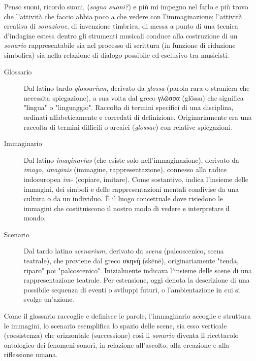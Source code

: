 Penso suoni, ricordo suoni, (\emph{sogno suoni?}) e più mi impegno nel farlo e
più trovo che l'attività che faccio abbia poco a che vedere con l'immaginazione;
l'attività creativa di \emph{sonazione}, di invenzione timbrica, di messa a
punto di una tecnica d'indagine estesa dentro gli strumenti musicali
\cite{netti23} conduce alla costruzione di un \emph{sonario} rappresentabile sia
nel processo di scrittura (in funzione di riduzione simbolica) sia nella
relazione di dialogo possibile ed esclusivo tra musicisti.

\begin{description}
  \item[Glossario] Dal latino tardo \emph{glossarium}, derivato da \emph{glossa}
  (parola rara o straniera che necessita spiegazione), a sua volta dal greco
  \textgreek{γλῶσσα} (glōssa) che significa "lingua" o "linguaggio". Raccolta di
  termini specifici di una disciplina, ordinati alfabeticamente e corredati di
  definizione. Originariamente era una raccolta di termini difficili o arcaici
  (\emph{glossae}) con relative spiegazioni.
  \item[Immaginario] Dal latino \emph{imaginarius} (che esiste solo
  nell'immaginazione), derivato da \emph{imago, imaginis} (immagine,
  rappresentazione), connesso alla radice indoeuropea \emph{im-} (copiare,
  imitare). Come sostantivo, indica l'insieme delle immagini, dei simboli e
  delle rappresentazioni mentali condivise da una cultura o da un individuo. È
  il luogo concettuale dove risiedono le immagini che costituiscono il nostro
  modo di vedere e interpretare il mondo.
  \item[Scenario] Dal tardo latino \emph{scenarium}, derivato da \emph{scena}
  (palcoscenico, scena teatrale), che proviene dal greco \textgreek{σκηνή}
  (skēnē), originariamente "tenda, riparo" poi "palcoscenico". Inizialmente
  indicava l'insieme delle scene di una rappresentazione teatrale. Per
  estensione, oggi denota la descrizione di una possibile sequenza di eventi o
  sviluppi futuri, o l'ambientazione in cui si svolge un'azione.
\end{description}

Come il glossario raccoglie e definisce le parole, l'immaginario accoglie e
struttura le immagini, lo scenario esemplifica lo spazio delle scene, sia esso
verticale (coesistenza) che orizzontale (successione) così il \emph{sonario}
diventa il ricettacolo ontologico dei fenomeni sonori, in relazione all'ascolto,
alla creazione e alla riflessione umana.

